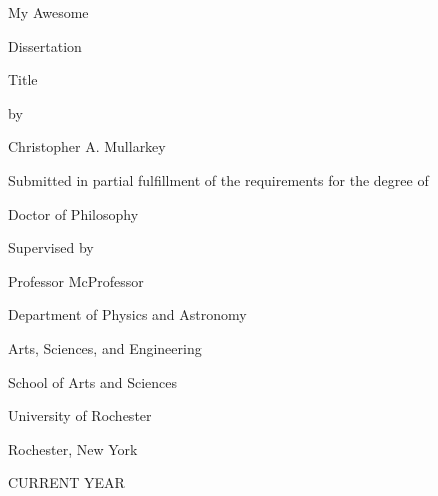 \documentclass[\main/master.tex]{subfiles}
\begin{document}
\pagestyle{empty}
\begin{titlepage}
\doublespacing
\begin{center}
  {\titlefont My Awesome\par \vspace{10 mm}
   Dissertation \par \vspace{10 mm}
   Title}
   \vfill
   by\par
   \vfill
   Christopher A. Mullarkey\par
   \vspace{1.5in}
   Submitted in partial fulfillment of the requirements for the degree of\par
   \vfill
   Doctor of Philosophy\par
   \vfill
   Supervised by\par
   Professor McProfessor\par
   \vspace{1.5in}
   Department of Physics and Astronomy\par
   Arts, Sciences, and Engineering\par
   School of Arts and Sciences \par
   \vfill
   University of Rochester \par
   Rochester, New York \par
   CURRENT YEAR
   \end{center}
  \end{titlepage}
\end{document}
